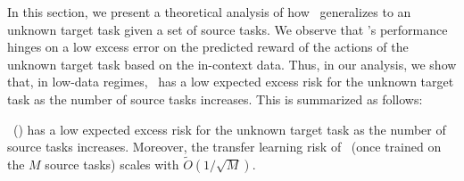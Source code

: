 In this section, we present a theoretical analysis of how \predt\ generalizes to an unknown target task given a set of source tasks. We observe that \predt's performance hinges on a low excess error on the predicted reward of the actions of the unknown target task based on the in-context data. Thus, in our analysis, we show that, in low-data regimes, \predt\ has a low expected excess risk for the unknown target task as the number of source tasks increases. This is summarized as follows:

\begin{tcolorbox}
\customfinding \pred\ (\gt) has a low expected excess risk for the unknown target task as the number of source tasks increases.  Moreover, the transfer learning risk of \predt\ (once trained on the $M$ source tasks) scales with $\widetilde{O}(1/\sqrt{M})$. 
\end{tcolorbox}




